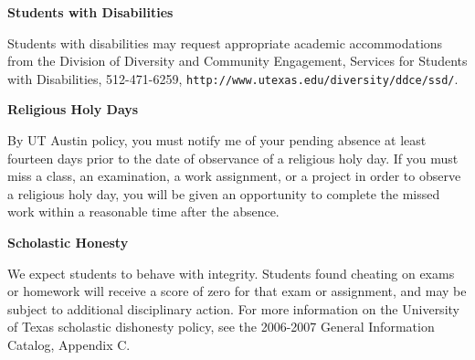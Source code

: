\documentclass[11pt]{article}
\begin{document}
\vspace{5mm}

\textbf{\large Students with Disabilities }

Students with disabilities may request appropriate academic accommodations from the Division of Diversity and Community Engagement, Services for Students with Disabilities, 512-471-6259, \texttt{http://www.utexas.edu/diversity/ddce/ssd/}.

\vspace{3mm}
\textbf{\large Religious Holy Days}

By UT Austin policy, you must notify me of your pending absence at least fourteen days prior to the date of observance of a religious holy day.  If you must miss a class, an examination, a work assignment, or a project in order to observe a religious holy day, you will be given an opportunity to complete the missed work within a reasonable time after the absence.

\vspace{3mm}
\textbf{\large Scholastic Honesty}

We expect students to behave with integrity.  Students found cheating on exams or homework will receive a score of zero for that exam or assignment, and may be subject to additional disciplinary action. For more information on the University of Texas scholastic dishonesty policy, see the 2006-2007 General Information Catalog, Appendix C.

\end{document}
